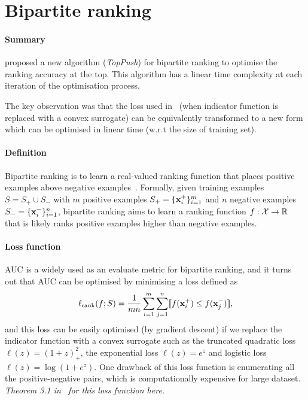 \section{Bipartite ranking}
\label{sec:birank}

\paragraph{Summary}
\citet{li:2014} proposed a new algorithm (\ie \emph{TopPush}) for bipartite ranking to optimise the ranking accuracy at the top.
This algorithm has a linear time complexity at each iteration of the optimisation process.

The key observation was that the loss used in~\cite{agarwal:2011} (when indicator function is replaced with a convex surrogate)
can be equivalently transformed to a new form 
which can be optimised in linear time (w.r.t the size of training set).


\paragraph{Definition} 
Bipartite ranking is to learn a real-valued ranking function that places positive examples above negative examples~\cite{li:2014}.
Formally, given training examples $S = S_+ \cup S_-$ with $m$ positive examples $S_+ = \{\mathbf{x}_i^+\}_{i=1}^m$ and $n$ negative examples $S_- = \{\mathbf{x}_i^-\}_{i=1}^n$, 
bipartite ranking aims to learn a ranking function $f: \mathcal{X} \to \mathbb{R}$ that is likely ranks positive examples higher than negative examples.

\paragraph{Loss function}
AUC is a widely used as an evaluate metric for bipartite ranking, and it turns out that AUC can be optimised by minimising a loss defined as~\cite{cortes:2004}
\begin{equation}
\label{eq:loss_auc}
\ell_\text{rank}(f; S) = \frac{1}{mn} \sum_{i=1}^m \sum_{j=1}^n \llbracket f(\mathbf{x}_i^+) \le f(\mathbf{x}_j^-) \rrbracket,
\end{equation}
and this loss can be easily optimised (\eg by gradient descent) if we replace the indicator function with a convex surrogate such as the truncated quadratic loss 
$\ell(z) = (1+z)_+^2$, the exponential loss $\ell(z) = e^z$ and logistic loss $\ell(z) = \log(1+e^z)$.
One drawback of this loss function is enumerating all the positive-negative pairs, which is computationally expensive for large dataset. \\
\emph{Theorem 3.1 in~\cite{dembczynski:2010} for this loss function here.}

